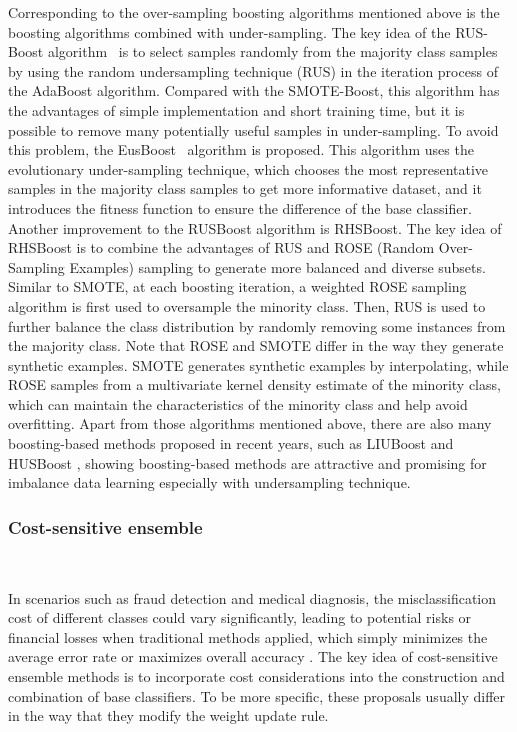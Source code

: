Corresponding to the over-sampling boosting algorithms mentioned above is the boosting algorithms combined with under-sampling. The key idea of the RUS-Boost algorithm~\cite{ref_20} is to select samples randomly from the majority class samples by using the random undersampling technique (RUS) in the iteration process of the AdaBoost algorithm. Compared with the SMOTE-Boost, this algorithm has the advantages of simple implementation and short training time, but it is possible to remove many potentially useful samples in under-sampling. To avoid this problem, the EusBoost~\cite{ref_21} algorithm is proposed. This algorithm uses the evolutionary under-sampling technique, which chooses the most representative samples in the majority class samples to get more informative dataset, and it introduces the fitness function to ensure the difference of the base classifier.
Another improvement to the RUSBoost algorithm is RHSBoost. 
The key idea of RHSBoost \cite{gong2017rhsboost} is to combine the advantages of RUS and ROSE (Random Over-Sampling Examples) \cite{lunardon2014rose} sampling to generate more balanced and diverse subsets. Similar to SMOTE, at each boosting iteration, a weighted ROSE sampling algorithm is first used to oversample the minority class. Then, RUS is used to further balance the class distribution by randomly removing some instances from the majority class.
Note that ROSE and SMOTE differ in the way they generate synthetic examples. SMOTE generates synthetic examples by interpolating, while ROSE samples from a multivariate kernel density estimate of the minority class, which can maintain the characteristics of the minority class and help avoid overfitting. 
Apart from those algorithms mentioned above, there are also many boosting-based methods proposed in recent years, such as LIUBoost \cite{ahmed2019liuboost} and HUSBoost \cite{popel2018hybrid}, showing boosting-based methods are attractive and promising for imbalance data learning especially with undersampling technique.



\subsubsection{Cost-sensitive ensemble}\
\label{s343}

In scenarios such as fraud detection and medical diagnosis, the misclassification cost of different classes could vary significantly, leading to potential risks or financial losses when traditional methods applied, which simply minimizes the average error rate or maximizes overall accuracy \cite{ling2008cost}.
The key idea of cost-sensitive ensemble methods is to incorporate cost considerations into the construction and combination of base classifiers. To be more specific, these proposals usually differ in the way that they modify the weight update rule.

